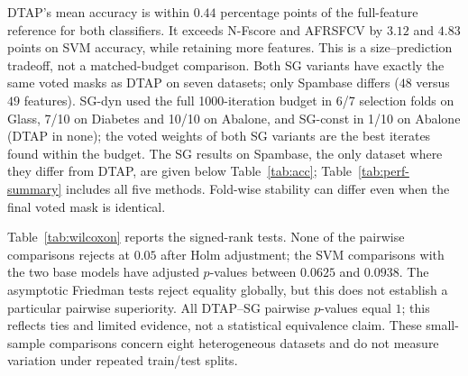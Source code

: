 \documentclass[]{interact}
\theoremstyle{plain}
\theoremstyle{definition}
\theoremstyle{remark}
\begin{document}
DTAP's mean accuracy is within $0.44$ percentage points of the full-feature
reference for both classifiers. It exceeds N-Fscore and AFRSFCV by $3.12$
and $4.83$ points on SVM accuracy, while retaining more features.
This is a size--prediction tradeoff, not a matched-budget comparison.
Both SG variants have exactly the same voted masks as DTAP on seven datasets;
only Spambase differs ($48$ versus $49$ features).
SG-dyn used the full 1000-iteration budget in 6/7 selection folds on Glass,
7/10 on Diabetes and 10/10 on Abalone, and SG-const in 1/10 on Abalone
(DTAP in none); the voted weights of both SG variants are the best iterates
found within the budget. The SG results on Spambase, the only
dataset where they differ from DTAP, are given below Table~\ref{tab:acc};
Table~\ref{tab:perf-summary} includes all five methods.
Fold-wise stability can differ even when the final voted mask is identical.

Table~\ref{tab:wilcoxon} reports the signed-rank tests. None of the pairwise
comparisons rejects at $0.05$ after Holm adjustment; the SVM comparisons with
the two base models have adjusted $p$-values between $0.0625$ and $0.0938$.
The asymptotic Friedman tests reject equality globally, but this does not establish
a particular pairwise superiority. All DTAP--SG pairwise $p$-values equal $1$;
this reflects ties and limited evidence, not a statistical equivalence claim.
These small-sample comparisons concern eight heterogeneous datasets and do not
measure variation under repeated train/test splits.
\end{document}
